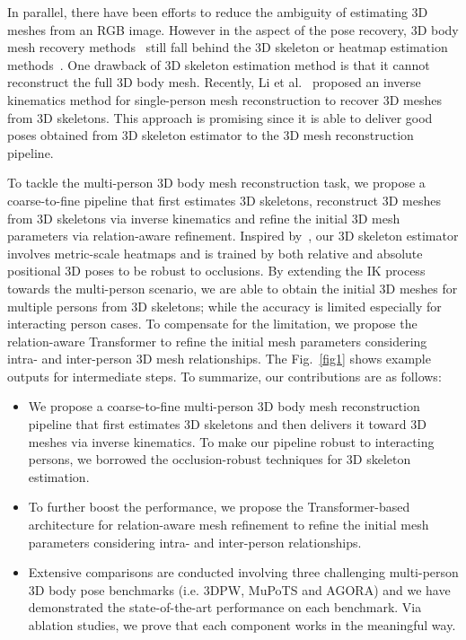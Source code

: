 \documentclass[runningheads]{llncs}
\begin{document}
In parallel, there have been efforts to reduce the ambiguity of estimating 3D meshes from an RGB image. However in the aspect of the pose recovery, 3D body mesh recovery methods~\cite{kanazawa2018end,kocabas2020vibe,kocabas2021pare,kolotouros2019learning} still fall behind the 3D skeleton or heatmap estimation methods~\cite{cheng20203d,cheng2019occlusion,iskakov2019learnable,sun2018integral}. One drawback of 3D skeleton estimation method is that it cannot reconstruct the full 3D body mesh. Recently, Li et al.~\cite{li2021hybrik} proposed an inverse kinematics method for single-person mesh reconstruction to recover 3D meshes from 3D skeletons. This approach is promising since it is able to deliver good poses obtained from 3D skeleton estimator to the 3D mesh reconstruction pipeline.

To tackle the multi-person 3D body mesh reconstruction task, we propose a coarse-to-fine pipeline that first estimates 3D skeletons, reconstruct 3D meshes from 3D skeletons via inverse kinematics and refine the initial 3D mesh parameters via relation-aware refinement. Inspired by~\cite{sarandi2020metrabs}, our 3D skeleton estimator involves metric-scale heatmaps and is trained by both relative and absolute positional 3D poses to be robust to occlusions. By extending the IK process~\cite{li2021hybrik} towards the multi-person scenario, we are able to obtain the initial 3D meshes for multiple persons from 3D skeletons; while the accuracy is limited especially for interacting person cases. To compensate for the limitation, we propose the relation-aware Transformer to refine the initial mesh parameters considering intra- and inter-person 3D mesh relationships. The Fig.~\ref{fig1} shows example outputs for intermediate steps. To summarize, our contributions are as follows:
\begin{itemize}
\item We propose a coarse-to-fine multi-person 3D body mesh reconstruction pipeline that first estimates 3D skeletons and then delivers it toward 3D meshes via inverse kinematics. To make our pipeline robust to interacting persons, we borrowed the occlusion-robust techniques for 3D skeleton estimation.
\item To further boost the performance, we propose the Transformer-based architecture for relation-aware mesh refinement to refine the initial mesh parameters considering intra- and inter-person relationships.
\item Extensive comparisons are conducted involving three challenging multi-person 3D body pose benchmarks (i.e. 3DPW, MuPoTS and AGORA) and we have demonstrated the state-of-the-art performance on each benchmark. Via ablation studies, we prove that each component works in the meaningful way.
\end{itemize}
\end{document}
